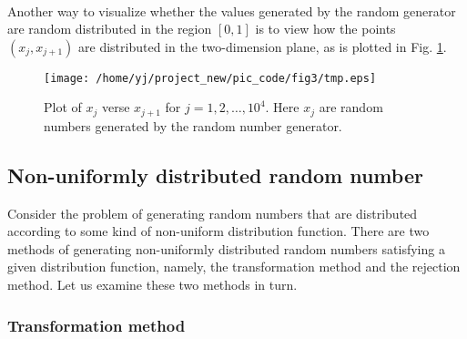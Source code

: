 \documentclass{article}
\begin{document}
\

Another way to visualize whether the values generated by the random generator
are random distributed in the region $[0, 1]$ is to view how the points $(x_j,
x_{j + 1})$ are distributed in the two-dimension plane, as is plotted in Fig.
\ref{1-22-1}.

\begin{figure}[h]
  \texttt{[image: /home/yj/project\_new/pic\_code/fig3/tmp.eps]}
  \caption{\label{1-22-1}Plot of $x_j$ verse $x_{j + 1}$ for $j = 1, 2,
  \ldots, 10^4$. Here $x_j$ are random numbers generated by the random number
  generator.}
\end{figure}

\subsection{Non-uniformly distributed random number}

Consider the problem of generating random numbers that are distributed
according to some kind of non-uniform distribution function. There are two
methods of generating non-uniformly distributed random numbers satisfying a
given distribution function, namely, the transformation method and the
rejection method{\cite{Fitzpatrickcp}}. Let us examine these two methods in
turn.

\subsubsection{Transformation method}
\end{document}
